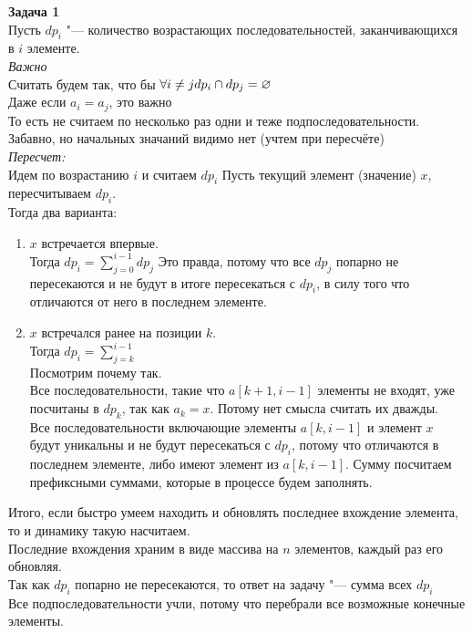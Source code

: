 \documentclass[14pt,a4paper,report]{ncc}
\begin{document}
\textbf{Задача 1}\\
Пусть $dp_i$ "--- количество возрастающих последовательностей, заканчивающихся в $i$ элементе.\\
\textit{Важно}\\
Считать будем так, что бы $\forall i \neq j \\dp_i \cap dp_j = \varnothing$\\
Даже если $a_i = a_j$, это важно\\
То есть не считаем по несколько раз одни и теже подпоследовательности.\\
Забавно, но начальных значаний видимо нет (учтем при пересчёте)\\
\textit{Пересчет:}\\
Идем по возрастанию $i$ и считаем $dp_i$
Пусть текущий элемент (значение) $x$, пересчитываем $dp_i$.\\
Тогда два варианта:\\
\begin{enumerate}
    \item {
        $x$ встречается впервые.\\
        Тогда $dp_i = \sum_{j=0}^{i - 1}dp_j$
        Это правда, потому что все $dp_j$ попарно не пересекаются и не будут в итоге пересекаться с $dp_i$, в силу того что отличаются от него в последнем элементе.
    }
    \item {
        $x$ встречался ранее на позиции $k$.\\
        Тогда $dp_i = \sum_{j = k}^{i - 1}$\\
        Посмотрим почему так.\\
        Все последовательности, такие что $a[k + 1, i - 1]$ элементы не входят, уже посчитаны в $dp_k$, так как $a_k = x$. Потому нет смысла считать их дважды.\\
        Все последовательности включающие элементы $a[k, i - 1]$ и элемент $x$ будут уникальны и не будут пересекаться с $dp_i$, потому что отличаются в последнем элементе, либо имеют элемент из $a[k, i - 1]$.
        Сумму посчитаем префиксными суммами, которые в процессе будем заполнять.
    }
\end{enumerate}
Итого, если быстро умеем находить и обновлять последнее вхождение элемента, то и динамику такую насчитаем.\\
Последние вхождения храним в виде массива на $n$ элементов, каждый раз его обновляя.\\
Так как $dp_i$ попарно не пересекаются, то ответ на задачу "--- сумма всех $dp_i$\\
Все подпоследовательности учли, потому что перебрали все возможные конечные элементы.\\
\end{document}
